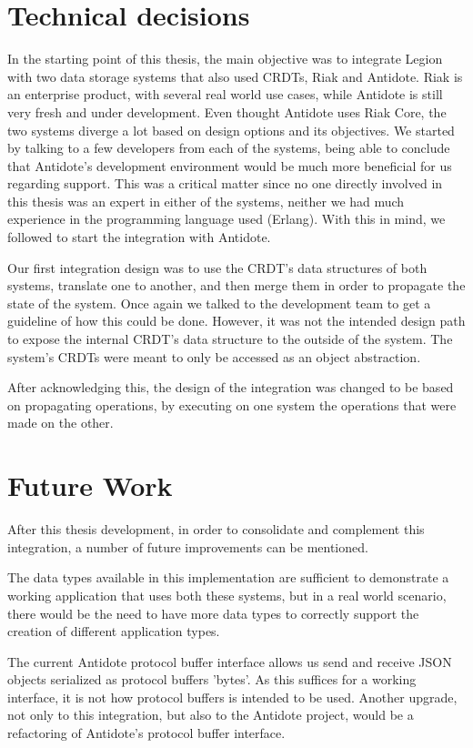 \section{Technical decisions}
\label{sec:technical_decisions}
In the starting point of this thesis, the main objective was to integrate Legion with two data storage systems that also used CRDTs, Riak and Antidote. Riak is an enterprise product, with several real world use cases, while Antidote is still very fresh and under development. Even thought Antidote uses Riak Core, the two systems diverge a lot based on design options and its objectives. We started by talking to a few developers from each of the systems, being able to conclude that Antidote's development environment would be much more beneficial for us regarding support. This was a critical matter since no one directly involved in this thesis was an expert in either of the systems, neither we had much experience in the programming language used (Erlang). With this in mind, we followed to start the integration with Antidote.\par
	Our first integration design was to use the CRDT's data structures of both systems, translate one to another, and then merge them in order to propagate the state of the system. Once again we talked to the development team to get a guideline of how this could be done. However, it was not the intended design path to expose the internal CRDT's data structure to the outside of the system. The system's CRDTs were meant to only be accessed as an object abstraction.\par
	After acknowledging this, the design of the integration was changed to be based on propagating operations, by executing on one system the operations that were made on the other.

\section{Future Work}
\label{sec:future_work}
After this thesis development, in order to consolidate and complement this integration, a number of future improvements can be mentioned.\par
	The data types available in this implementation are sufficient to demonstrate a working application that uses both these systems, but in a real world scenario, there would be the need to have more data types to correctly support the creation of different application types.\par
	The current Antidote protocol buffer interface allows us send and receive JSON objects serialized as protocol buffers 'bytes'. As this suffices for a working interface, it is not how protocol buffers is intended to be used. Another upgrade, not only to this integration, but also to the Antidote project, would be a refactoring of Antidote's protocol buffer interface.